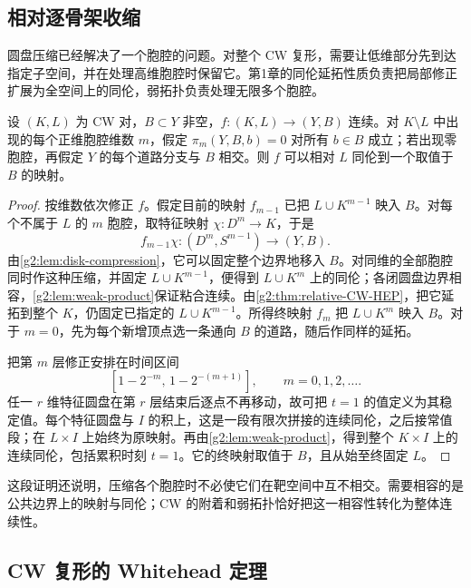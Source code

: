 \subsection{相对逐骨架收缩}
\label{g2:subsec:0903:02}

圆盘压缩已经解决了一个胞腔的问题。对整个 CW 复形，需要让低维部分先到达指定子空间，并在处理高维胞腔时保留它。第1章的同伦延拓性质负责把局部修正扩展为全空间上的同伦，弱拓扑负责处理无限多个胞腔。

\begin{lemma}\label{g2:lem:cellular-compression}
	设 \((K,L)\) 为 CW 对，\(B\subset Y\) 非空，\(f:(K,L)\rightarrow(Y,B)\) 连续。对 \(K\setminus L\) 中出现的每个正维胞腔维数 \(m\)，假定 \(\pi_m(Y,B,b)=0\) 对所有 \(b\in B\) 成立；若出现零胞腔，再假定 \(Y\) 的每个道路分支与 \(B\) 相交。则 \(f\) 可以相对 \(L\) 同伦到一个取值于 \(B\) 的映射。
\end{lemma}
\begin{proof}
	按维数依次修正 \(f\)。假定目前的映射 \(f_{m-1}\) 已把 \(L\cup K^{m-1}\) 映入 \(B\)。对每个不属于 \(L\) 的 \(m\) 胞腔，取特征映射 \(\chi:D^m\rightarrow K\)，于是
	\[
		f_{m-1}\chi:(D^m,S^{m-1})\longrightarrow(Y,B).
	\]
	由\cref{g2:lem:disk-compression}，它可以固定整个边界地移入 \(B\)。对同维的全部胞腔同时作这种压缩，并固定 \(L\cup K^{m-1}\)，便得到 \(L\cup K^m\) 上的同伦；各闭圆盘边界相容，\cref{g2:lem:weak-product}保证粘合连续。由\cref{g2:thm:relative-CW-HEP}，把它延拓到整个 \(K\)，仍固定已指定的 \(L\cup K^{m-1}\)。所得终映射 \(f_m\) 把 \(L\cup K^m\) 映入 \(B\)。对于 \(m=0\)，先为每个新增顶点选一条通向 \(B\) 的道路，随后作同样的延拓。

	把第 \(m\) 层修正安排在时间区间
	\[
		[1-2^{-m},\,1-2^{-(m+1)}],\qquad m=0,1,2,\ldots.
	\]
	任一 \(r\) 维特征圆盘在第 \(r\) 层结束后逐点不再移动，故可把 \(t=1\) 的值定义为其稳定值。每个特征圆盘与 \(I\) 的积上，这是一段有限次拼接的连续同伦，之后接常值段；在 \(L\times I\) 上始终为原映射。再由\cref{g2:lem:weak-product}，得到整个 \(K\times I\) 上的连续同伦，包括累积时刻 \(t=1\)。它的终映射取值于 \(B\)，且从始至终固定 \(L\)。
\end{proof}

这段证明还说明，压缩各个胞腔时不必使它们在靶空间中互不相交。需要相容的是公共边界上的映射与同伦；CW 的附着和弱拓扑恰好把这一相容性转化为整体连续性。

\subsection{CW 复形的 Whitehead 定理}
\label{g2:subsec:0903:03}

